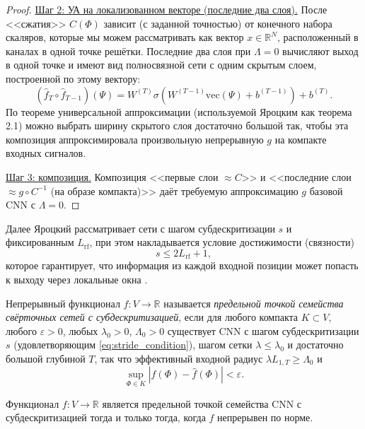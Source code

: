 \documentclass[../NDCNNAI_main.tex]{subfiles}
\begin{document}
\begin{proof}
\underline{Шаг 2: УА на локализованном векторе (последние два слоя).}
После <<сжатия>> $C(\Phi)$ зависит (с заданной точностью) от конечного набора скаляров, которые мы можем рассматривать
как вектор $x\in\mathbb{R}^N$, расположенный в каналах в одной точке решётки.
Последние два слоя при $\Lambda=0$ вычисляют выход в одной точке и имеют вид
полносвязной сети с одним скрытым слоем, построенной по этому вектору:
\[
(\widehat f_T\circ \widehat f_{T-1})(\Psi)
=
W^{(T)}\sigma(W^{(T-1)}\mathrm{vec}(\Psi)+b^{(T-1)})+b^{(T)}.
\]
По теореме универсальной аппроксимации (используемой Яроцким как теорема 2.1)
можно выбрать ширину скрытого слоя достаточно большой так, чтобы
эта композиция аппроксимировала произвольную непрерывную $g$ на компакте входных сигналов.

\underline{Шаг 3: композиция.}
Композиция <<первые слои $\approx C$>> и <<последние слои $\approx g\circ C^{-1}$ (на образе компакта)>>
даёт требуемую аппроксимацию $g$ базовой CNN с $\Lambda=0$.  
\end{proof}

Далее Яроцкий рассматривает сети с шагом субдескритизации $s$ и фиксированным $L_{\mathrm{rf}}$,
при этом накладывается условие достижимости (связности)
\begin{equation}
s\le 2L_{\mathrm{rf}}+1,
\label{eq:stride_condition}  
\end{equation}
которое гарантирует, что информация из каждой входной позиции может попасть к выходу через локальные окна \cite[(3.29)]{Yarotsky2018}.

\begin{definition}
Непрерывный функционал $f\colon V\to\mathbb{R}$ называется \emph{предельной точкой семейства свёрточных сетей с субдескритизацией},
если для любого компакта $K\subset V$, любого $\varepsilon>0$, любых $\lambda_0>0$, $\Lambda_0>0$
существует CNN с шагом субдескритизации $s$ (удовлетворяющим \eqref{eq:stride_condition}),
шагом сетки $\lambda\le\lambda_0$ и достаточно большой глубиной $T$, так что эффективный входной радиус
$\lambda L_{1,T}\ge \Lambda_0$ и
\[
\sup_{\Phi\in K}|f(\Phi)-\widehat f(\Phi)|<\varepsilon.
\]  
\end{definition}

\begin{theorem}
Функционал $f\colon V\to\mathbb{R}$ является предельной точкой семейства CNN с субдескритизацией
тогда и только тогда, когда $f$ непрерывен по норме.  
\end{theorem}
\end{document}
